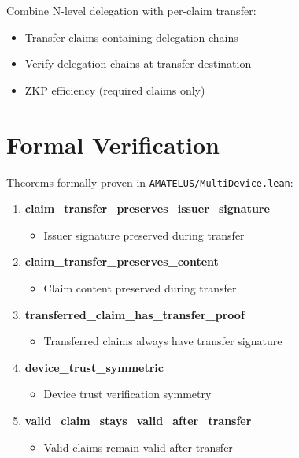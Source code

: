 Combine N-level delegation with per-claim transfer:

\begin{itemize}
  \item Transfer claims containing delegation chains
  \item Verify delegation chains at transfer destination
  \item ZKP efficiency (required claims only)
\end{itemize}

\section{Formal Verification}

Theorems formally proven in \texttt{AMATELUS/MultiDevice.lean}:

\begin{enumerate}
  \item \textbf{claim\_transfer\_preserves\_issuer\_signature}
    \begin{itemize}
      \item Issuer signature preserved during transfer
    \end{itemize}

  \item \textbf{claim\_transfer\_preserves\_content}
    \begin{itemize}
      \item Claim content preserved during transfer
    \end{itemize}

  \item \textbf{transferred\_claim\_has\_transfer\_proof}
    \begin{itemize}
      \item Transferred claims always have transfer signature
    \end{itemize}

  \item \textbf{device\_trust\_symmetric}
    \begin{itemize}
      \item Device trust verification symmetry
    \end{itemize}

  \item \textbf{valid\_claim\_stays\_valid\_after\_transfer}
    \begin{itemize}
      \item Valid claims remain valid after transfer
    \end{itemize}
\end{enumerate}

